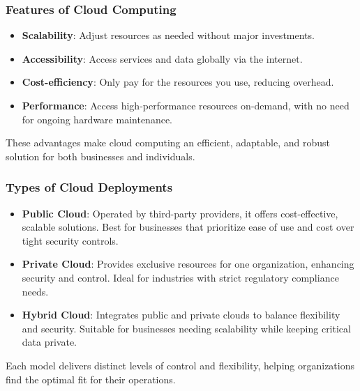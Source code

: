 \documentclass{beamer}
\begin{document}
\begin{frame}
    \frametitle{Features of Cloud Computing}
    \begin{itemize}
        \item\textbf{Scalability}: Adjust resources as needed without major investments.
        \item\textbf{Accessibility}: Access services and data globally via the internet.
        \item\textbf{Cost{-}efficiency}: Only pay for the resources you use, reducing overhead.
        \item\textbf{Performance}: Access high{-}performance resources on{-}demand, with no need for ongoing hardware maintenance.
    \end{itemize}

    \vspace{10pt}

    These advantages make cloud computing an efficient, adaptable, and robust solution for both businesses and individuals.
\end{frame}

\begin{frame}
    \frametitle{Types of Cloud Deployments}
    \vspace{10pt}
    \begin{itemize}
        \item\textbf{Public Cloud}: Operated by third{-}party providers, it offers cost{-}effective, scalable solutions. Best for businesses that prioritize ease of use and cost over tight security controls.
        \item\textbf{Private Cloud}: Provides exclusive resources for one organization, enhancing security and control. Ideal for industries with strict regulatory compliance needs.
        \item\textbf{Hybrid Cloud}: Integrates public and private clouds to balance flexibility and security. Suitable for businesses needing scalability while keeping critical data private.
    \end{itemize}
    \vspace{10pt}
    Each model delivers distinct levels of control and flexibility, helping organizations find the optimal fit for their operations.
\end{frame}
\end{document}
